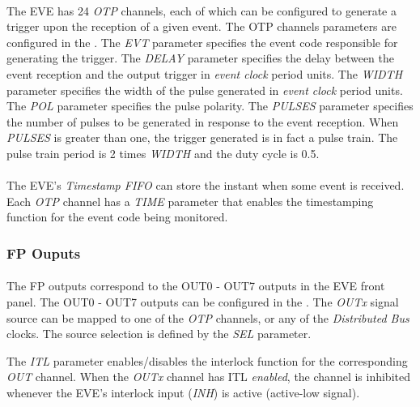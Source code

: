 \documentclass[openany]{article}
\begin{document}
			\paragraph{} The EVE has 24 \emph{OTP} channels, each of which can be configured to generate a trigger upon the reception of a given event. The OTP channels parameters are configured in the .
			The \emph{EVT} parameter specifies the event code responsible for generating the trigger.
			The \emph{DELAY} parameter specifies the delay between the event reception and the output trigger in \emph{event clock} period units.
			The \emph{WIDTH} parameter specifies the width of the pulse generated in \emph{event clock} period units.
			The \emph{POL} parameter specifies the pulse polarity.
			The \emph{PULSES} parameter specifies the number of pulses to be generated in response to the event reception. When \emph{PULSES} is greater than one, the trigger generated is in fact a pulse train. The pulse train period is 2 times \emph{WIDTH} and the duty cycle is 0.5.
			\paragraph{} The EVE's \emph{Timestamp FIFO} can store the instant when some event is received. Each \emph{OTP} channel has a \emph{TIME} parameter that enables the timestamping function for the event code being monitored.

		\subsubsection{FP Ouputs}\label{sec:eve-fp-outputs}

			\paragraph{} The FP outputs correspond to the OUT0 - OUT7 outputs in the EVE front panel. The OUT0 - OUT7 outputs can be configured in the . The \emph{OUTx} signal source can be mapped to one of the \emph{OTP} channels, or any of the \emph{Distributed Bus} clocks. The source selection is defined by the \emph{SEL} parameter.
			\par The \emph{ITL} parameter enables/disables the interlock function for the corresponding \emph{OUT} channel. When the \emph{OUTx} channel has ITL \emph{enabled}, the channel is inhibited whenever the EVE's interlock input (\emph{INH}) is active (active-low signal).
\end{document}

